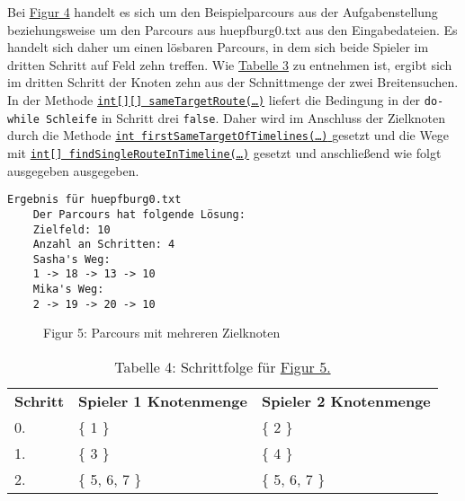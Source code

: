 \documentclass[a4paper,10pt,ngerman]{scrartcl}
\begin{document}
	Bei \hyperref[fig:Figure4]{Figur 4} handelt es sich um den Beispielparcours aus der Aufgabenstellung
	beziehungsweise um den Parcours aus huepfburg0.txt aus den Eingabedateien.
	Es handelt sich daher um einen lösbaren Parcours, 
	in dem sich beide Spieler im dritten Schritt auf Feld zehn treffen.
	Wie \hyperref[tab:Table3]{Tabelle 3} zu entnehmen ist, ergibt sich im dritten Schritt der Knoten zehn aus
	der Schnittmenge der zwei Breitensuchen.
	In der Methode \hyperref[lst:sameTargetRoute]{\texttt{int[][] sameTargetRoute(\ldots)}} 
	liefert die Bedingung in der \texttt{do-while Schleife} in Schritt drei \texttt{false}.
	Daher wird im Anschluss der Zielknoten durch die Methode 
	\hyperref[lst:firstSameTargetOfTimelines]{\texttt{int firstSameTargetOfTimelines(\ldots)} }
	gesetzt und die Wege mit \hyperref[lst:findSingleRouteInTimeline]{\texttt{int[] findSingleRouteInTimeline(\ldots)}} gesetzt und anschließend wie folgt ausgegeben ausgegeben.
	
	\begin{lstlisting}[frame=single, title=Programmausgabe Figur 4., breaklines=true]
  Ergebnis für huepfburg0.txt
	Der Parcours hat folgende Lösung:
	Zielfeld: 10
	Anzahl an Schritten: 4
	Sasha's Weg: 
	1 -> 18 -> 13 -> 10
	Mika's Weg: 
	2 -> 19 -> 20 -> 10
    \end{lstlisting}

        \begin{figure}[h!]
        \centering
        \FigurFuenf{}
        \caption{Figur 5: Parcours mit mehreren Zielknoten}
        \label{fig:Figure5}
    \end{figure}

    \begin{table}[h!]
        \centering
        \begin{tabular}{lll}
            \textbf{Schritt} & \textbf{Spieler 1 Knotenmenge} & \textbf{Spieler 2 Knotenmenge} \\
            0.               & \{ 1 \}                        & \{ 2 \}                        \\
            1.               & \{ 3 \}                        & \{  4 \}                         \\
            2.               & \{ 5, 6, 7 \}                  & \{ 5, 6, 7 \}                  \\
        \end{tabular}
        \caption{Tabelle 4: Schrittfolge für \hyperref[fig:Figure5]{Figur 5.}}
        \label{tab:Table4}
    \end{table}
\end{document}
